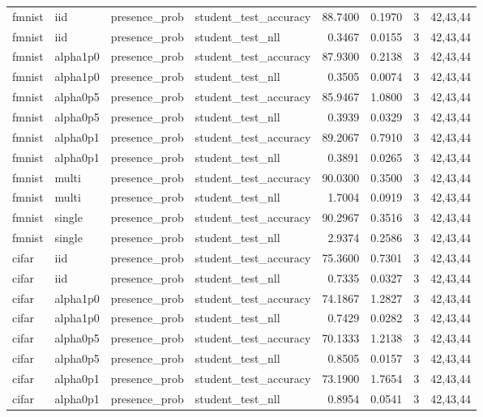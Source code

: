 \begin{tabular}{llllrrrl}
fmnist & iid & presence\_prob & student\_test\_accuracy & 88.7400 & 0.1970 & 3 & 42,43,44 \\
fmnist & iid & presence\_prob & student\_test\_nll & 0.3467 & 0.0155 & 3 & 42,43,44 \\
fmnist & alpha1p0 & presence\_prob & student\_test\_accuracy & 87.9300 & 0.2138 & 3 & 42,43,44 \\
fmnist & alpha1p0 & presence\_prob & student\_test\_nll & 0.3505 & 0.0074 & 3 & 42,43,44 \\
fmnist & alpha0p5 & presence\_prob & student\_test\_accuracy & 85.9467 & 1.0800 & 3 & 42,43,44 \\
fmnist & alpha0p5 & presence\_prob & student\_test\_nll & 0.3939 & 0.0329 & 3 & 42,43,44 \\
fmnist & alpha0p1 & presence\_prob & student\_test\_accuracy & 89.2067 & 0.7910 & 3 & 42,43,44 \\
fmnist & alpha0p1 & presence\_prob & student\_test\_nll & 0.3891 & 0.0265 & 3 & 42,43,44 \\
fmnist & multi & presence\_prob & student\_test\_accuracy & 90.0300 & 0.3500 & 3 & 42,43,44 \\
fmnist & multi & presence\_prob & student\_test\_nll & 1.7004 & 0.0919 & 3 & 42,43,44 \\
fmnist & single & presence\_prob & student\_test\_accuracy & 90.2967 & 0.3516 & 3 & 42,43,44 \\
fmnist & single & presence\_prob & student\_test\_nll & 2.9374 & 0.2586 & 3 & 42,43,44 \\
cifar & iid & presence\_prob & student\_test\_accuracy & 75.3600 & 0.7301 & 3 & 42,43,44 \\
cifar & iid & presence\_prob & student\_test\_nll & 0.7335 & 0.0327 & 3 & 42,43,44 \\
cifar & alpha1p0 & presence\_prob & student\_test\_accuracy & 74.1867 & 1.2827 & 3 & 42,43,44 \\
cifar & alpha1p0 & presence\_prob & student\_test\_nll & 0.7429 & 0.0282 & 3 & 42,43,44 \\
cifar & alpha0p5 & presence\_prob & student\_test\_accuracy & 70.1333 & 1.2138 & 3 & 42,43,44 \\
cifar & alpha0p5 & presence\_prob & student\_test\_nll & 0.8505 & 0.0157 & 3 & 42,43,44 \\
cifar & alpha0p1 & presence\_prob & student\_test\_accuracy & 73.1900 & 1.7654 & 3 & 42,43,44 \\
cifar & alpha0p1 & presence\_prob & student\_test\_nll & 0.8954 & 0.0541 & 3 & 42,43,44 \\

\end{tabular}
